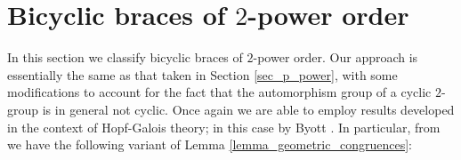 \documentclass[reqno]{amsart}
\theoremstyle{definition}
\newtheorem{theorem}{Theorem}[section]
\DeclareMathOperator{\Hol}{\mbox{Hol}}
\begin{document}


\section{Bicyclic braces of $ 2 $-power order} \label{sec_2_power}

In this section we classify bicyclic braces of $ 2 $-power order. Our approach is essentially the same as that taken in Section \ref{sec_p_power}, with some modifications to account for the fact that the automorphism group of a cyclic $ 2 $-group is in general not cyclic. Once again we are able to employ results developed in the context of Hopf-Galois theory; in this case by Byott \cite{By07}. In particular, from \cite[Proposition 7.1]{By07} we have the following variant of Lemma \ref{lemma_geometric_congruences}:
\end{document}
